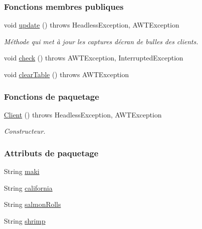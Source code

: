 \subsubsection*{Fonctions membres publiques}
\begin{DoxyCompactItemize}
\item 
void \hyperlink{classTestSushi_1_1src_1_1Suchi_1_1Client_a50f1e325b703b85c56546ca5999abeeb}{update} ()  throws Headless\+Exception, A\+W\+T\+Exception
\begin{DoxyCompactList}\small\item\em Méthode qui met à jour les captures d\textquotesingle{}écran de bulles des clients. \end{DoxyCompactList}\item 
void \hyperlink{classTestSushi_1_1src_1_1Suchi_1_1Client_ad353c24b9c2af3e11796d26050d88c48}{check} ()  throws A\+W\+T\+Exception, Interrupted\+Exception
\item 
void \hyperlink{classTestSushi_1_1src_1_1Suchi_1_1Client_af6f639320c7a31df600b0590487a1992}{clear\+Table} ()  throws A\+W\+T\+Exception 
\end{DoxyCompactItemize}
\subsubsection*{Fonctions de paquetage}
\begin{DoxyCompactItemize}
\item 
\hyperlink{classTestSushi_1_1src_1_1Suchi_1_1Client_aa526fb492301ef47dbaf7e0395416e60}{Client} ()  throws Headless\+Exception, A\+W\+T\+Exception
\begin{DoxyCompactList}\small\item\em Constructeur. \end{DoxyCompactList}\end{DoxyCompactItemize}
\subsubsection*{Attributs de paquetage}
\begin{DoxyCompactItemize}
\item 
String \hyperlink{classTestSushi_1_1src_1_1Suchi_1_1Client_a0de54dcf18e79e239fba1b01dece6ee5}{maki}
\item 
String \hyperlink{classTestSushi_1_1src_1_1Suchi_1_1Client_a2f0c0a782e724648db382a2de6abef73}{california}
\item 
String \hyperlink{classTestSushi_1_1src_1_1Suchi_1_1Client_aafc1efaa04206c67060116fe39c71371}{salmon\+Rolls}
\item 
String \hyperlink{classTestSushi_1_1src_1_1Suchi_1_1Client_ada365a5bc05af97839595dc0b04e5476}{shrimp}
\end{DoxyCompactItemize}
